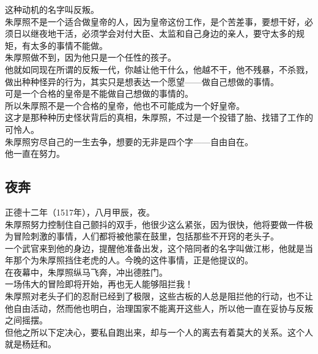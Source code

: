 \begin{multicols}{\theparacolNo}
这种动机的名字叫反叛。\\

朱厚照不是一个适合做皇帝的人，因为皇帝这份工作，是个苦差事，要想干好，必须日以继夜地干活，必须学会对付大臣、太监和自己身边的亲人，要守太多的规矩，有太多的事情不能做。\\

朱厚照做不到，因为他只是一个任性的孩子。\\

他就如同现在所谓的反叛一代，你越让他干什么，他越不干，他不残暴，不杀戮，做出种种怪异的行为，其实只是想表达一个愿望——做自己想做的事情。\\

可是一个合格的皇帝是不能做自己想做的事情的。\\

所以朱厚照不是一个合格的皇帝，他也不可能成为一个好皇帝。\\

这才是那种种历史怪状背后的真相，朱厚照，不过是一个投错了胎、找错了工作的可怜人。\\

朱厚照穷尽自己的一生去争，想要的无非是四个字——自由自在。\\

他一直在努力。\\

\subsection{夜奔}
正德十二年（1517年），八月甲辰，夜。\\

朱厚照努力控制住自己颤抖的双手，他很少这么紧张，因为很快，他将要做一件极为冒险刺激的事情，人们都将被他蒙在鼓里，包括那些不开窍的老头子。\\

一个武官来到他的身边，提醒他准备出发，这个陪同者的名字叫做江彬，他就是当年那个为朱厚照挡住老虎的人。今晚的这件事情，正是他提议的。\\

在夜幕中，朱厚照纵马飞奔，冲出德胜门。\\

一场伟大的冒险即将开始，再也无人能够阻拦我！\\

朱厚照对老头子们的忍耐已经到了极限，这些古板的人总是阻拦他的行动，也不让他自由活动，然而他也明白，治理国家不能离开这些人，所以他一直在妥协与反叛之间摇摆。\\

但他之所以下定决心，要私自跑出来，却与一个人的离去有着莫大的关系。这个人就是杨廷和。\\


\end{multicols}
